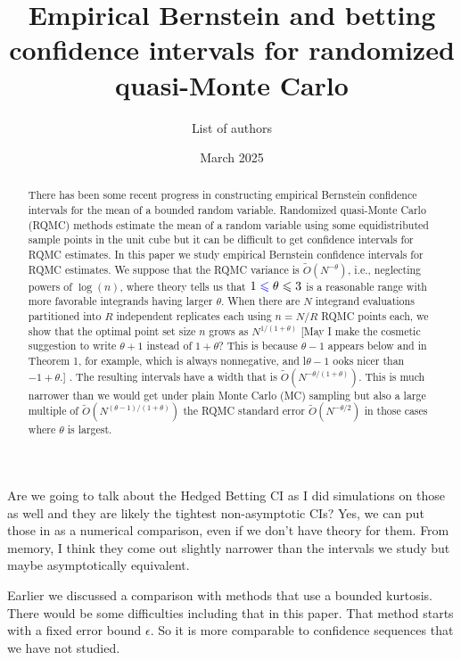 \documentclass{article}
\title{Empirical Bernstein and betting confidence intervals for randomized quasi-Monte Carlo}
\date{March 2025}
\author{List of authors}
\newcommand{\art}[1]{\begingroup\color{blue}#1\endgroup}
\newcommand{\aadit}[1]{\begingroup\color{orange}#1\endgroup}
\newcommand{\fred}[1]{\begingroup\color{red}#1\endgroup}
\renewcommand{\le}{\leqslant}
\begin{document}
\maketitle
\begin{abstract}
There has been some recent progress in constructing empirical Bernstein
confidence intervals for the mean of a bounded random variable.
Randomized quasi-Monte Carlo (RQMC) methods estimate the mean of a random
variable using some equidistributed sample points in the unit cube
but it can be difficult to get confidence intervals for RQMC
estimates.  In this paper we study empirical Bernstein confidence
intervals for RQMC estimates.  We suppose that
the RQMC variance is $\tilde O(N^{-\theta})$\fred{, i.e., neglecting powers of $\log (n)$,} where
theory tells us that $1\art{\le}\theta\le3$ 
is a reasonable
range with more favorable integrands having larger
$\theta$. When there are $N$ integrand evaluations
partitioned into $R$ independent replicates each using $n=N/R$
RQMC points each, we show that the optimal point set size $n$ grows
as $N^{1/(1+\theta)}$ \fred{[May I make the cosmetic suggestion to write $\theta +1$ instead of $1 + \theta$?  This is because $\theta - 1$ appears below and in Theorem 1, for example, which is always nonnegative, and l$\theta - 1$ ooks  nicer than $-1+\theta$.] }. The resulting intervals have
a width that is $\tilde O(N^{-\theta/(1+\theta)})$. 
This is  much narrower
than we would get under plain Monte Carlo (MC) sampling
but also a large multiple of \fred{$\tilde O(N^{(\theta - 1)/(1+\theta)})$ }the RQMC standard error $\tilde O(N^{-\theta/2})$ in those cases where $\theta$ is largest.
\end{abstract}

\aadit{Are we going to talk about the Hedged Betting CI as I did simulations on those as well and they are likely the tightest non-asymptotic CIs?}
\art{Yes, we can put those in as a numerical comparison, even if we don't have theory for them.  From memory, I think they come out slightly narrower
than the intervals we study but maybe asymptotically equivalent.}

\art{Earlier we discussed a comparison with methods that use a
bounded kurtosis. There would be some difficulties including that
in this paper.  That method starts with a fixed error bound $\epsilon$. So
it is more comparable to confidence sequences that we have not
studied.}
\end{document}
